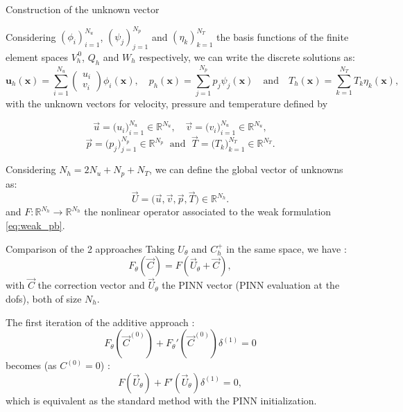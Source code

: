 
\begin{appendixframe}{Construction of the unknown vector}

	Considering $(\phi_i)_{i=1}^{N_u}$, $(\psi_j)_{j=1}^{N_p}$ and $(\eta_k)_{k=1}^{N_T}$ the basis functions of the finite element spaces $V_h^{\, 0}$, $Q_h$ and $W_h$ respectively, we can write the discrete solutions as:
	\begin{equation*}
		\bm{u}_h(\bm{x}) = \sum_{i=1}^{N_u} \begin{pmatrix}
			u_i \\
			v_i
		\end{pmatrix} \phi_i(\bm{x}), \quad p_h(\bm{x}) = \sum_{j=1}^{N_p} p_j \psi_j(\bm{x}) \quad \text{and} \quad T_h(\bm{x}) = \sum_{k=1}^{N_T} T_k \eta_k(\bm{x}),
	\end{equation*}	
	with the unknown vectors for velocity, pressure and temperature defined by

	\vspace{-5pt}
	$$\vec{u} = \big(u_i\big)_{i=1}^{N_u} \in \mathbb{R}^{N_u}, \quad \vec{v} = \big(v_i\big)_{i=1}^{N_u} \in \mathbb{R}^{N_u},$$
	$$\vec{p} = \big(p_j\big)_{j=1}^{N_p} \in \mathbb{R}^{N_p} \; \text{ and } \; \vec{T} = \big(T_k\big)_{k=1}^{N_T} \in \mathbb{R}^{N_T}.$$

	\vspace{5pt}
	Considering $N_h = 2N_u + N_p + N_T$, we can define the global vector of unknowns as:
	\begin{equation*}
		\vec{U} = \big(\vec{u}, \vec{v}, \vec{p}, \vec{T}) \in \mathbb{R}^{N_h}.
	\end{equation*}
	and $F:\mathbb{R}^{N_h} \to \mathbb{R}^{N_h}$ the nonlinear operator associated to the weak formulation \eqref{eq:weak_pb}.
\end{appendixframe}



\begin{appendixframe}{Comparison of the 2 approaches}
	Taking $U_\theta$ and $C_h^+$ in the same space, we have :
	$$F_\theta(\vec{C})=F(\vec{U}_\theta+\vec{C}),$$
	with $\vec{C}$ the correction vector and $\vec{U}_\theta$ the PINN vector (PINN evaluation at the dofs), both of size $N_h$.

	The first iteration of the additive approach :
	$$ F_\theta(\vec{C}^{(0)}) + F_\theta'(\vec{C}^{(0)}) \delta^{(1)} = 0 $$
	becomes (as $C^{(0)}=0$) :
	$$F(\vec{U}_\theta) + F'(\vec{U}_\theta)\delta^{(1)}=0,$$
	which is equivalent as the standard method with the PINN initialization.
\end{appendixframe}

